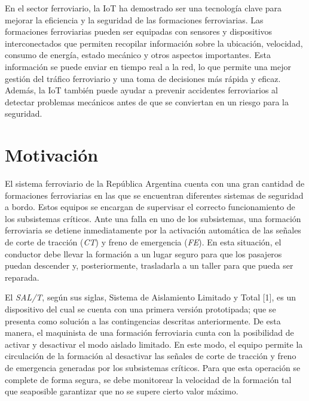 En el sector ferroviario, la IoT ha demostrado ser una tecnología clave para mejorar la eficiencia y la seguridad de las formaciones ferroviarias. Las formaciones ferroviarias pueden ser equipadas con sensores y dispositivos interconectados que permiten recopilar información sobre la ubicación, velocidad, consumo de energía, estado mecánico y otros aspectos importantes. Esta información se puede enviar en tiempo real a la red, lo que permite una mejor gestión del tráfico ferroviario y una toma de decisiones más rápida y eficaz. Además, la IoT también puede ayudar a prevenir accidentes ferroviarios al detectar problemas mecánicos antes de que se conviertan en un riesgo para la seguridad.


%

\newpage
\section{Motivación}

El sistema ferroviario de la República Argentina cuenta con una gran cantidad de formaciones ferroviarias en las que se encuentran diferentes sistemas de seguridad a bordo. Estos equipos se encargan de supervisar el correcto funcionamiento de los subsistemas críticos. Ante una falla en uno de los subsistemas, una formación ferroviaria se detiene inmediatamente por la activación automática de las señales de corte de tracción (\textit{CT}) y freno de emergencia (\textit{FE}). En esta situación, el conductor debe llevar la formación a un lugar seguro para que los pasajeros puedan descender y, posteriormente, trasladarla a un taller para que pueda ser reparada.

El \textit{SAL/T}, según sus siglas, Sistema de Aislamiento Limitado y Total [1], es un dispositivo del cual se cuenta con una primera versión prototipada; que se presenta como solución a las contingencias descritas anteriormente. De esta manera, el maquinista de una formación ferroviaria cunta con la posibilidad de activar y desactivar el modo aislado limitado. En este modo, el equipo permite la circulación de la formación al desactivar las señales de corte de tracción y freno de emergencia generadas por los subsistemas críticos. Para que esta operación se complete de forma segura, se debe monitorear la velocidad de la formación tal que seaposible garantizar que no se supere cierto valor máximo.

